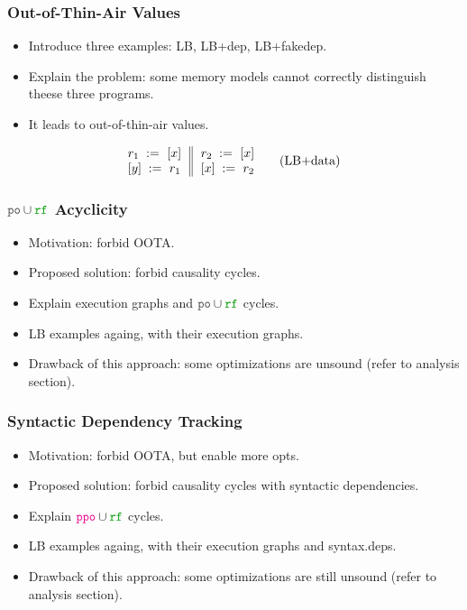 \subsubsection{Out-of-Thin-Air Values}
\label{sec:bgrnd-oota}

\begin{itemize}
  \item Introduce three examples: LB, LB+dep, LB+fakedep.
  \item Explain the problem: some memory models cannot 
    correctly distinguish theese three programs.
  \item It leads to out-of-thin-air values.
\end{itemize}

\begin{equation*}
\inarrII{
  \readInst{}{r_1}{x}      \\
  \writeInst{}{y}{r_1}     \\
}{
  \readInst{}{r_2}{x}      \\
  \writeInst{}{x}{r_2}     \\
}
\tag{LB+data}\label{ex:lb+data}
\end{equation*}


\subsubsection{$\lPO\cup\lRF$ Acyclicity}

\begin{itemize}
  \item Motivation: forbid OOTA.
  \item Proposed solution: forbid causality cycles. 
  \item Explain execution graphs and $\lPO\cup\lRF$ cycles.
  \item LB examples againg, with their execution graphs.
  \item Drawback of this approach: some optimizations are unsound 
    (refer to analysis section).
\end{itemize}

\subsubsection{Syntactic Dependency Tracking}

\begin{itemize}
  \item Motivation: forbid OOTA, but enable more opts.
  \item Proposed solution: forbid causality cycles with syntactic dependencies. 
  \item Explain $\lPPO\cup\lRF$ cycles.
  \item LB examples againg, with their execution graphs and syntax.deps.
  \item Drawback of this approach: some optimizations are still unsound 
    (refer to analysis section).
\end{itemize}

